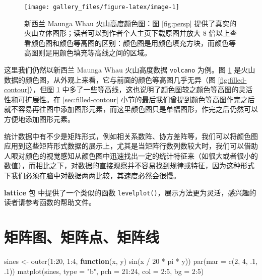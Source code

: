 \documentclass[
  b5paper,
  UTF8,twoside]{book}
\newenvironment{Shaded}{\begin{snugshade}}{\end{snugshade}}
\newcommand{\AttributeTok}[1]{\textcolor[rgb]{0.77,0.63,0.00}{#1}}
\newcommand{\ControlFlowTok}[1]{\textcolor[rgb]{0.13,0.29,0.53}{\textbf{#1}}}
\newcommand{\DecValTok}[1]{\textcolor[rgb]{0.00,0.00,0.81}{#1}}
\newcommand{\FunctionTok}[1]{\textcolor[rgb]{0.00,0.00,0.00}{#1}}
\newcommand{\NormalTok}[1]{#1}
\newcommand{\OtherTok}[1]{\textcolor[rgb]{0.56,0.35,0.01}{#1}}
\newcommand{\SpecialCharTok}[1]{\textcolor[rgb]{0.00,0.00,0.00}{#1}}
\newcommand{\StringTok}[1]{\textcolor[rgb]{0.31,0.60,0.02}{#1}}
\begin{document}
\begin{figure}

{\centering \texttt{[image: gallery\_files/figure-latex/image-1]} 

}

\caption[新西兰 Maunga Whau 火山高度数据颜色图]{新西兰 Maunga Whau 火山高度颜色图：图 \ref{fig:persp} 提供了真实的火山立体图形；读者可以到作者个人主页下载原图并放大 8 倍以上查看颜色图和颜色等高图的区别：颜色图是用颜色填充方块，而颜色等高图则是用颜色填充等高线之间的区域。}\label{fig:image}
\end{figure}

这里我们仍然以新西兰 Maunga Whau 火山高度数据 \texttt{volcano} 为例。图 \ref{fig:image}
是火山数据的颜色图，从外观上来看，它与前面的颜色等高图几乎无异（图 \ref{fig:filled-contour}），但图 \ref{fig:image} 中多了一些等高线，这也说明了颜色图较之颜色等高图的灵活性和可扩展性。在 \ref{sec:filled-contour} 小节的最后我们曾提到颜色等高图作完之后就不容易再往图中添加图形元素，而这里颜色图只是单幅图形，作完之后仍然可以方便地添加图形元素。

统计数据中有不少是矩阵形式，例如相关系数阵、协方差阵等，我们可以将颜色图应用到这些矩阵形式数据的展示上，尤其是当矩阵行数列数较大时，我们可以借助人眼对颜色的视觉感知从颜色图中迅速找出一定的统计特征来（如很大或者很小的数值），而相比之下，对数据的直接观察并不容易找到规律或特征，因为这种形式下我们必须在脑中对数据两两比较，其速度必然会很慢。

\textbf{lattice} 包 \citep{Sarkar08} 中提供了一个类似的函数 \texttt{levelplot()}，展示方法更为灵活，感兴趣的读者请参考函数的帮助文件。

\hypertarget{sec:matplot}{%
\section{矩阵图、矩阵点、矩阵线}\label{sec:matplot}}





\begin{Shaded}
\begin{Highlighting}[]
\NormalTok{sines }\OtherTok{\textless{}{-}} \FunctionTok{outer}\NormalTok{(}\DecValTok{1}\SpecialCharTok{:}\DecValTok{20}\NormalTok{, }\DecValTok{1}\SpecialCharTok{:}\DecValTok{4}\NormalTok{, }\ControlFlowTok{function}\NormalTok{(x, y) }\FunctionTok{sin}\NormalTok{(x }\SpecialCharTok{/} \DecValTok{20} \SpecialCharTok{*}\NormalTok{ pi }\SpecialCharTok{*}\NormalTok{ y))}
\FunctionTok{par}\NormalTok{(}\AttributeTok{mar =} \FunctionTok{c}\NormalTok{(}\DecValTok{2}\NormalTok{, }\DecValTok{4}\NormalTok{, .}\DecValTok{1}\NormalTok{, .}\DecValTok{1}\NormalTok{))}
\FunctionTok{matplot}\NormalTok{(sines, }\AttributeTok{type =} \StringTok{"b"}\NormalTok{, }\AttributeTok{pch =} \DecValTok{21}\SpecialCharTok{:}\DecValTok{24}\NormalTok{, }\AttributeTok{col =} \DecValTok{2}\SpecialCharTok{:}\DecValTok{5}\NormalTok{, }\AttributeTok{bg =} \DecValTok{2}\SpecialCharTok{:}\DecValTok{5}\NormalTok{)}
\end{Highlighting}
\end{Shaded}
\end{document}
